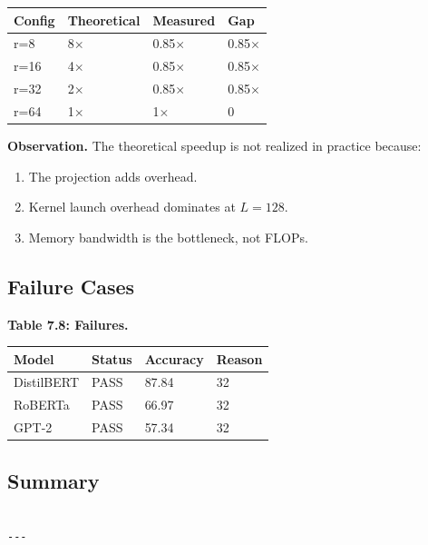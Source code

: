 \begin{table}[H]
\centering
\small
\begin{tabular}{llll}
\toprule
\textbf{Config} & \textbf{Theoretical} & \textbf{Measured} & \textbf{Gap} \\
\midrule
r=8 & 8$\times$ & 0.85$\times$ & 0.85$\times$ \\
r=16 & 4$\times$ & 0.85$\times$ & 0.85$\times$ \\
r=32 & 2$\times$ & 0.85$\times$ & 0.85$\times$ \\
r=64 & 1$\times$ & 1$\times$ & 0 \\
\bottomrule
\end{tabular}
\end{table}

\textbf{Observation.} The theoretical speedup is not realized in practice 
because:
\begin{enumerate}
\item The projection adds overhead.
\item Kernel launch overhead dominates at $L = 128$.
\item Memory bandwidth is the bottleneck, not FLOPs.

\end{enumerate}
\subsection{Failure Cases}

\textbf{Table 7.8: Failures.}

\begin{table}[H]
\centering
\small
\begin{tabular}{llll}
\toprule
\textbf{Model} & \textbf{Status} & \textbf{Accuracy} & \textbf{Reason} \\
\midrule
DistilBERT & PASS & 87.84 & 32 \\
RoBERTa & PASS & 66.97 & 32 \\
GPT-2 & PASS & 57.34 & 32 \\
\bottomrule
\end{tabular}
\end{table}

\subsection{Summary}

\begin{lstlisting}

---
\end{lstlisting}

